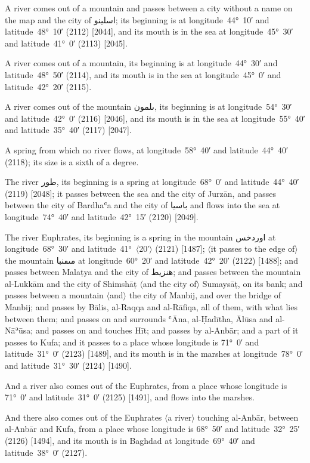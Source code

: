 \documentclass[11pt]{article}
\newcommand{\Pg}[1]{\marginpar{\footnotesize #1}}
\newcommand{\Ang}[1]{\ensuremath{#1}}
\begin{document}
A river comes out of a mountain and passes between a city without a name on the map and the city of \textarabic{اسلينو}; its beginning is at longitude~44°~10′ and latitude~48°~10′ (2112) [2044], and its mouth is in the sea at longitude~45°~30′ and latitude~41°~0′ (2113) [2045].

A river comes out of a mountain, its beginning is at longitude~44°~30′ and latitude~48°~50′ (2114), and its mouth is in the sea at longitude~45°~0′ and latitude~42°~20′ (2115).

A river comes out of the mountain \textarabic{ٮلمون}, its beginning is at longitude~54°~30′ and latitude~42°~0′ (2116) [2046], and its mouth is in the sea at longitude~55°~40′ and latitude~35°~40′ (2117) [2047].

A spring from which no river flows, at longitude~58°~40′ and latitude~44°~40′ (2118); its size is a sixth of a degree.

The river \textarabic{طور}, its beginning is a spring at longitude~68°~0′ and latitude~44°~40′ (2119) [2048]; it passes between the sea and the city of Jurzān, and passes between the city of Bardhaʿa and the city of \textarabic{باسيا} and flows into the sea at longitude~74°~40′ and latitude~42°~15′ (2120) [2049].

The river Euphrates, its beginning is a spring in the mountain \textarabic{اوردخس} at longitude~68°~30′ and latitude~41°~\Ang{\langle}20′\Ang{\rangle} (2121) [1487]\Pg{p. 140}; \Ang{\langle}it passes to the edge of\Ang{\rangle} the mountain \textarabic{مٮڡنبا} at longitude~60°~20′ and latitude~42°~20′ (2122) [1488]; and passes between Malaṭya and the city of \textarabic{هنزيط}; and passes between the mountain al-Lukkām and the city of Shimshāṭ \Ang{\langle}and the city of\Ang{\rangle} Sumaysāṭ, on its bank; and passes between a mountain \Ang{\langle}and\Ang{\rangle} the city of Manbij, and over the bridge of Manbij; and passes by Bālis, al-Raqqa and al-Rāfiqa, all of them, with what lies between them; and passes on and surrounds ʿĀna, al-Ḥadītha, Ālūsa and al-Nāʾūsa; and passes on and touches Hīt; and passes by al-Anbār; and a part of it passes to Kufa; and it passes to a place whose longitude is 71°~0′ and latitude~31°~0′ (2123) [1489], and its mouth is in the marshes at longitude~78°~0′ and latitude~31°~30′ (2124) [1490].

And a river also comes out of the Euphrates, from a place whose longitude is 71°~0′ and latitude~31°~0′ (2125) [1491], and flows into the marshes.

And there also comes out of the Euphrates \Ang{\langle}a river\Ang{\rangle} touching al-Anbār, between al-Anbār and Kufa, from a place whose longitude is 68°~50′ and latitude~32°~25′ (2126) [1494], and its mouth is in Baghdad at longitude~69°~40′ and latitude~38°~0′ (2127).
\end{document}
